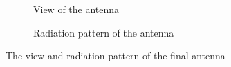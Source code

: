 \documentclass[12pt,DIV14,BCOR12mm,a4paper,footinclude=false,headinclude,parskip=half-,twoside,openright,cleardoublepage=empty,toc=index,bibliography=totoc,listof=totoc]{scrreprt}
\numberwithin{equation}{chapter}
\begin{document}
\begin{figure}[t]
    \centering
    \begin{subfigure}{0.45\textwidth}
        \centering
        \caption{View of the antenna}
    \end{subfigure}
    \begin{subfigure}{0.45\textwidth}
        \centering
        \caption{Radiation pattern of the antenna}
    \end{subfigure}
    \caption{The view and radiation pattern of the final antenna}
    \label{the view and radiation pattern of the final antenna}
\end{figure}
\end{document}
